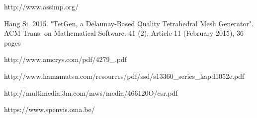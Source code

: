 \documentclass[12pt, a4paper,titlepage]{article}
\numberwithin{equation}{section}
\numberwithin{figure}{section}
\begin{document}
\begin{thebibliography}{99}
 http://www.assimp.org/

 Hang Si. 2015. "TetGen, a Delaunay-Based Quality Tetrahedral Mesh Generator". ACM Trans. on Mathematical Software. 41 (2), Article 11 (February 2015), 36 pages

 http://www.amcrys.com/pdf/4279\_.pdf

 http://www.hamamatsu.com/resources/pdf/ssd/s13360\_series\_kapd1052e.pdf

 http://multimedia.3m.com/mws/media/466120O/esr.pdf
 
 https://www.spenvis.oma.be/

\end{thebibliography}

\pagebreak

\listoffigures


\end{document}
